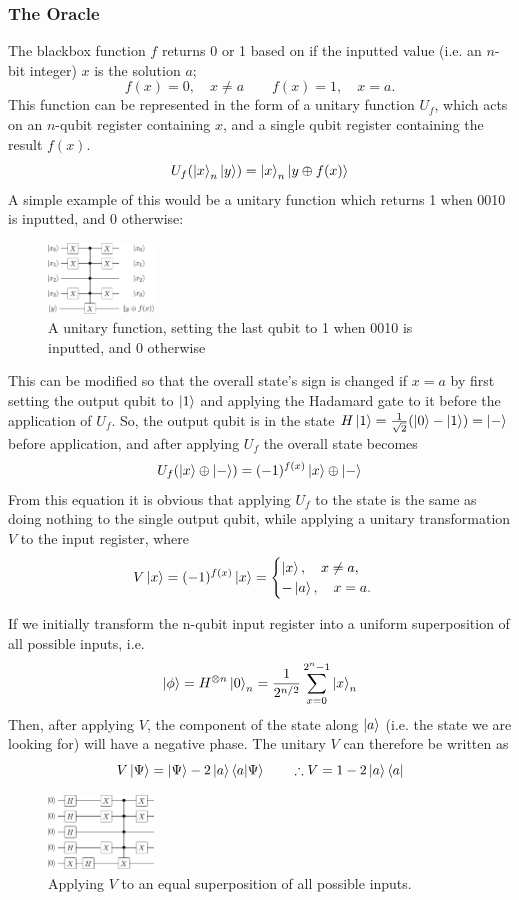 \documentclass[a4paper,10pt, titlepage, twoside]{article}
\begin{document}
\subsubsection{The Oracle}
The blackbox function $f$ returns 0 or 1 based on if the inputted value (i.e. an $n$-bit integer) $x$ is the solution $a$;
$$f(x) = 0, \quad x \neq a \qquad f(x) = 1, \quad x = a.$$
This function can be represented in the form of a unitary function $U_f$, which acts on an $n$-qubit register containing $x$, and a single qubit register containing the result $f(x)$.
$$U_f(\ket{x}_n\ket{y}) = \ket{x}_n\ket{y \oplus f(x)}$$
A simple example of this would be a unitary function which returns 1 when 0010 is inputted, and 0 otherwise:
\begin{figure}[H]
	\centering
	\includegraphics[width=0.25\textwidth]{oracle0010}
	\caption{A unitary function, setting the last qubit to 1 when 0010 is inputted, and 0 otherwise}
\end{figure}

This can be modified so that the overall state's sign is changed if $x = a$ by first setting the output qubit to $\ket{1}$ and applying the Hadamard gate to it before the application of $U_f$. So, the output qubit is in the state $H\ket{1} = \frac{1}{\sqrt{2}}(\ket{0} - \ket{1}) = \ket{-}$ before application, and after applying $U_f$ the overall state becomes
$$U_f(\ket{x} \oplus \ket{-}) = (-1)^{f(x)}\ket{x} \oplus \ket{-}$$
From this equation it is obvious that applying $U_f$ to the state is the same as doing nothing to the single output qubit, while applying a unitary transformation $V$ to the input register, where
\begin{equation}
	V\ket{x} = (-1)^{f(x)}\ket{x} = \begin{cases}
		\ket{x}, \quad x \neq a,\\
		-\ket{a}, \quad x = a.
	\end{cases}
\end{equation}

If we initially transform the n-qubit input register into a uniform superposition of all possible inputs, i.e.
$$\ket{\phi} = H^{\otimes n}\ket{0}_n = \frac{1}{2^{n/2}}\sum_{x=0}^{2^n-1}\ket{x}_n$$
Then, after applying $V$, the component of the state along $\ket{a}$ (i.e. the state we are looking for) will have a negative phase. The unitary $V$ can therefore be written as
$$V\ket{\Psi} = \ket{\Psi} - 2 \ket{a}\braket{a | \Psi} \qquad \therefore V = 1 - 2\ket{a}\bra{a}$$
\begin{figure}[H]
	\centering
	\includegraphics[width=0.25\textwidth]{oracle00102}
	\caption{Applying $V$ to an equal superposition of all possible inputs.}
\end{figure}
\end{document}
